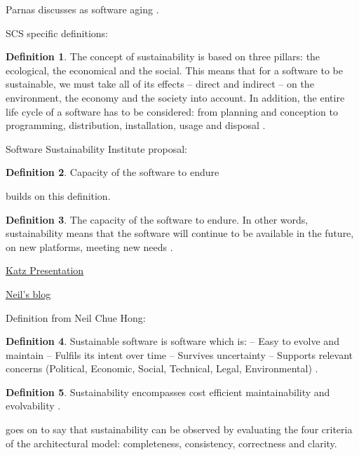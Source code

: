 \documentclass[letterpaper, cleveref]{lipics-v2019}
\theoremstyle{definition}
\newtheorem{defn}{Definition}
\begin{document}
Parnas discusses as software aging \citep{Parnas1994a}.

SCS specific definitions:

\begin{defn}
  The concept of sustainability is based on three pillars: the ecological, the
  economical and the social. This means that for a software to be sustainable,
  we must take all of its effects -- direct and indirect -- on the environment,
  the economy and the society into account. In addition, the entire life cycle
  of a software has to be considered: from planning and conception to
  programming, distribution, installation, usage and disposal \citep{Heine2017}.
\end{defn}

Software Sustainability Institute proposal:

\begin{defn}
Capacity of the software to endure
\end{defn}

\citet{Katz2016} builds on this definition.

\begin{defn}
  \noindent The capacity of the software to endure. In other words,
  sustainability means that the software will continue to be available in
  the future, on new platforms, meeting new needs \citep{Katz2016}.
\end{defn}

\href{https://collegeville.github.io/CW3S19/WorkshopResources/Presentations/4-5-Katz_data-driven-software-sustainability.pdf}
{Katz Presentation}

\href{https://www.software.ac.uk/blog/2019-09-12-making-open-source-research-software-visible-path-better-sustainability}
{Neil's blog}

Definition from Neil Chue Hong:
\begin{defn}
	Sustainable software is software which is:
	-- Easy to evolve and maintain
	-- Fulfils its intent over time
	-- Survives uncertainty
	-- Supports relevant concerns (Political, Economic, Social, Technical,
	Legal, Environmental) \citep{Katz2016}.
\end{defn}

\begin{defn}
Sustainability encompasses cost efficient maintainability and evolvability
\citep{SehestedtEtAl2014}.
\end{defn}

\citet{SehestedtEtAl2014} goes on to say that sustainability can be observed
by evaluating the four criteria of the architectural model: completeness,
consistency, correctness and clarity.
\end{document}
